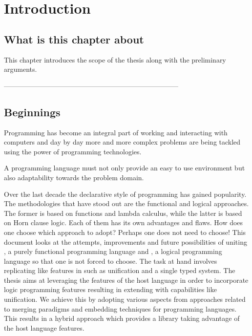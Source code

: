 \documentclass[thesis-solanki.tex]{subfiles}
\begin{document}
\chapter{Introduction}\label{chap:introduction}


\section{What is this chapter about}

This chapter introduces the scope of the thesis along with the preliminary arguments.


-----------------------------------------------------------------------------


\section{Beginnings}

Programming has become an integral part of working and interacting with computers and day by day more and more complex
problems are being tackled using the power of programming technologies.

A programming language must not only provide an easy to use environment but also adaptability towards the problem domain.

Over the last decade the declarative style of programming has gained popularity.
The methodologies that have stood out are the functional and logical approaches.
The former is based on functions and lambda calculus, while the latter is based on Horn clause logic.
Each of them has its own advantages and flaws.
How does one choose which approach to adopt?
Perhaps one does not need to choose!
This document looks at the attempts, improvements and future possibilities of uniting , a purely
functional programming language and , a logical programming language so that one is not forced to
choose. The task at hand involves replicating  like
features in  such as unification and a single typed system.
The thesis aims at leveraging the features of the host language in order to incorporate logic programming features
resulting in extending  with capabilities like unification.
We achieve this by adopting various aspects from approaches related to merging paradigms and embedding techniques
for programming languages.
This results in a hybrid approach which provides a library taking advantage of the host language features.
\end{document}
